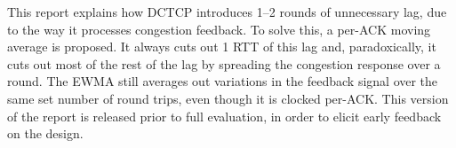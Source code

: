 This report explains how DCTCP introduces 1--2 rounds of unnecessary lag, due to
the way it processes congestion feedback. To solve this, a per-ACK moving
average is proposed. It always cuts out 1 RTT of this lag and, paradoxically, it
cuts out most of the rest of the lag by spreading the congestion response over a
round. The EWMA still averages out variations in the feedback signal over the
same set number of round trips, even though it is clocked per-ACK. This version
of the report is released prior to full evaluation, in order to elicit early
feedback on the design.
